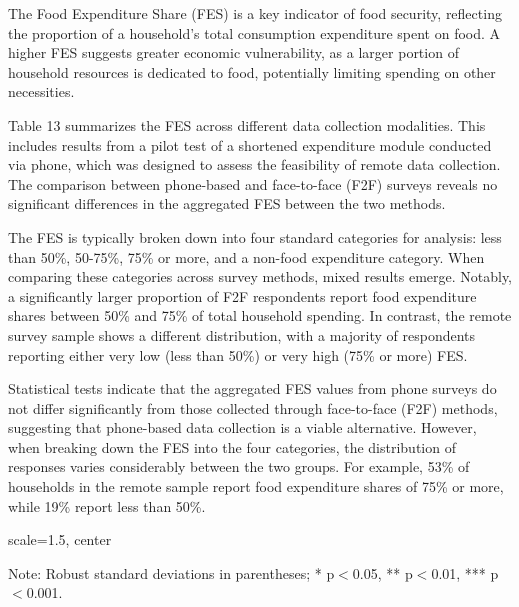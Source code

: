 \documentclass[11pt,harvard]{article}
\begin{document}
	The Food Expenditure Share (FES) is a key indicator of food security, reflecting the proportion of a household's total consumption expenditure spent on food. A higher FES suggests greater economic vulnerability, as a larger portion of household resources is dedicated to food, potentially limiting spending on other necessities.

	Table 13 summarizes the FES across different data collection modalities. This includes results from a pilot test of a shortened expenditure module conducted via phone, which was designed to assess the feasibility of remote data collection. The comparison between phone-based and face-to-face (F2F) surveys reveals no significant differences in the aggregated FES between the two methods.
	
	The FES is typically broken down into four standard categories for analysis: less than 50\%, 50-75\%, 75\% or more, and a non-food expenditure category. When comparing these categories across survey methods, mixed results emerge. Notably, a significantly larger proportion of F2F respondents report food expenditure shares between 50\% and 75\% of total household spending. In contrast, the remote survey sample shows a different distribution, with a majority of respondents reporting either very low (less than 50\%) or very high (75\% or more) FES.
	
	Statistical tests indicate that the aggregated FES values from phone surveys do not differ significantly from those collected through face-to-face (F2F) methods, suggesting that phone-based data collection is a viable alternative. However, when breaking down the FES into the four categories, the distribution of responses varies considerably between the two groups. For example, 53\% of households in the remote sample report food expenditure shares of 75\% or more, while 19\% report less than 50\%.
	
	\begin{table}[htbp]
		\centering
		\begin{adjustbox}{scale=1.5, center}
			\begin{threeparttable}
				\caption{Impact of Survey Modality on Expenditure and Food Expenditure Share}
				\scriptsize
				 
				\label{tab:FES_Modality_BF}
				\begin{tablenotes}
					\item Note: Robust standard deviations in parentheses; * p$<$0.05, ** p$<$0.01, *** p$<$0.001.
				\end{tablenotes}
			\end{threeparttable}
		\end{adjustbox}
	\end{table}
	
\end{document}
